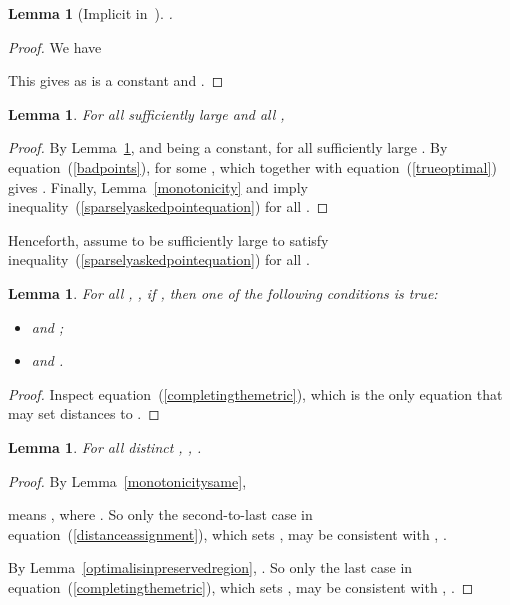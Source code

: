 \documentclass[letterpaper,12pt]{article}
\newtheorem{lemma}[theorem]{Lemma}
\newcommand{\comment}[1]{}
\begin{document}
\begin{lemma}[{Implicit in~\cite[Lemma~13]{Cha12}}]\label{fewbadpoints}
.
\end{lemma}
\begin{proof}
We have

This gives  as  is a constant and .
\end{proof}

\begin{lemma}\label{sparselyaskedpoint}
For all sufficiently large  and all ,

\end{lemma}
\begin{proof}
By Lemma~\ref{fewbadpoints},  and 
being a constant,
 for all sufficiently large .
By equation~(\ref{badpoints}), 
 for some ,
which together with equation~(\ref{trueoptimal})
gives .
Finally, Lemma~\ref{monotonicity} and 
imply inequality~(\ref{sparselyaskedpointequation}) for all .
\comment{Furthermore,

So
,
which together with
Lemma~\ref{monotonicity}
shows

for all sufficiently large 
and all .
}\end{proof}

Henceforth, assume  to be sufficiently large to satisfy
inequality~(\ref{sparselyaskedpointequation}) for all .

\begin{lemma}\label{onlysourceofdistance1}
For all , , if , then
one of the following conditions is true:
\begin{itemize}
\item  and ;
\item  and .
\end{itemize}
\end{lemma}
\begin{proof}
Inspect equation~(\ref{completingthemetric}), which
is the only equation that may set distances to .
\end{proof}

\comment{Below is a consequence of Lemma~\ref{onlysourceofdistance1}.

\begin{lemma}\label{sourceofshortdistances}
For all distinct
, , , if , then  and ,
.
\end{lemma}
}




\begin{lemma}\label{ordinarydistancesare2}
For all distinct , ,
.
\end{lemma}
\begin{proof}
By Lemma~\ref{monotonicitysame},

means , where .
So
only the second-to-last case
in equation~(\ref{distanceassignment}), which sets ,
may be consistent
with , .

By
Lemma~\ref{optimalisinpreservedregion},
.
So
only the last case
in equation~(\ref{completingthemetric}),
which sets ,
may be consistent
with , .
\end{proof}
\end{document}
